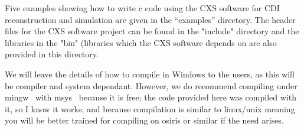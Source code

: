 \documentclass[]{cxs-software}
\begin{document}
Five examples showing how to write c code using the CXS software for
CDI reconstruction and simulation are given in the ``examples''
directory.  The header files for the CXS software project can be found
in the "include" directory and the libraries in the "bin" (libraries
which the CXS software depends on are also provided in this directory.

We will leave the details of how to compile in Windows to the users,
as this will be compiler and system dependant. However, we do
recommend compiling under mingw~\cite{} with msys~\cite{} because it
is free; the code provided here was compiled with it, so I know it
works; and because compilation is similar to linux/unix meaning you
will be better trained for compiling on osiris or similar if the need
arises.





\end{document}
